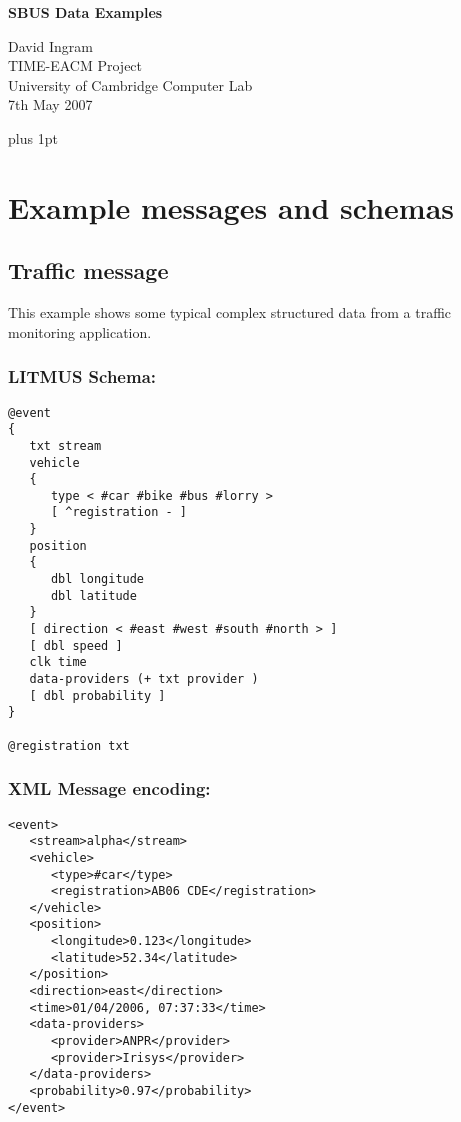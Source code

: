 \documentclass[12pt,a4paper,twoside]{article}
\renewcommand{\_}{\texttt{\symbol{95}}}
\begin{document}
\centerline{\textbf{\LARGE SBUS Data Examples}}
\begin{center} \large
David Ingram\\
TIME-EACM Project\\
University of Cambridge Computer Lab\\
7th May 2007\\
\end{center}

{ \parskip 1mm plus 1pt \tableofcontents }
\pagestyle{fancy}

\appendix
\section{Example messages and schemas}

\subsection{Traffic message}

This example shows some typical complex structured data from a traffic
monitoring application.

\subsubsection*{LITMUS Schema:}

\begin{verbatim}
@event
{
   txt stream
   vehicle
   {
      type < #car #bike #bus #lorry >
      [ ^registration - ]
   }
   position
   {
      dbl longitude
      dbl latitude
   }
   [ direction < #east #west #south #north > ]
   [ dbl speed ]
   clk time
   data-providers (+ txt provider )
   [ dbl probability ]
}

@registration txt
\end{verbatim}

\subsubsection*{XML Message encoding:}

\begin{verbatim}
<event>
   <stream>alpha</stream>
   <vehicle>
      <type>#car</type>
      <registration>AB06 CDE</registration>
   </vehicle>
   <position>
      <longitude>0.123</longitude>
      <latitude>52.34</latitude>
   </position>
   <direction>east</direction>
   <time>01/04/2006, 07:37:33</time>
   <data-providers>
      <provider>ANPR</provider>
      <provider>Irisys</provider>
   </data-providers>
   <probability>0.97</probability>
</event>
\end{verbatim}
\end{document}
